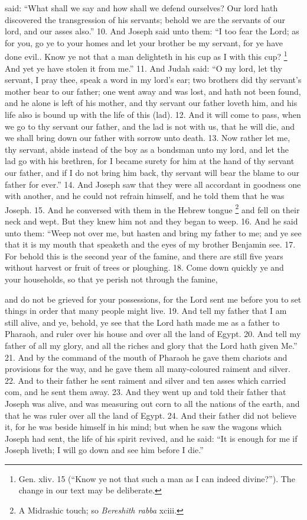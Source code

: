 said: ``What shall we say and how shall we defend ourselves? Our lord hath discovered the transgression of his servants; behold we are the servants of our lord, and our asses also.'' 10. And Joseph said unto them: ``I too fear the Lord; as for you, go ye to your homes and let your brother be my servant, for ye have done evil.. Know ye not that a man delighteth in his cup as I with this cup? \footnote{Gen. xliv. 15 (``Know ye not that such a man as I can indeed divine?''). The change in our text may be deliberate.} And yet ye have stolen it from me.'' 11. And Judah said: ``O my lord, let thy servant, I pray thee, speak a word in my lord's ear; two brothers did thy servant's mother bear to our father; one went away and was lost, and hath not been found, and he alone is left of his mother, and thy servant our father loveth him, and his life also is bound up with the life of this (lad). 12. And it will come to pass, when we go to thy servant our father, and the lad is not with us, that he will die, and we shall bring down our father with sorrow unto death. 13. Now rather let me, thy servant, abide instead of the boy as a bondsman unto my lord, and let the lad go with his brethren, for I became surety for him at the hand of thy servant our father, and if I do not bring him back, thy servant will bear the blame to our father for ever.'' 14. And Joseph saw that they were all accordant in goodness one with another, and he could not refrain himself, and he told them that he was Joseph. 15. And he conversed with them in the Hebrew tongue \footnote{A Midrashic touch; so \emph{Bereshith rabba} xciii.} and fell on their neck and wept. But they knew him not and they began to weep. 16. And he said unto them: ``Weep not over me, but hasten and bring my father to me; and ye see that it is my mouth that speaketh and the eyes of my brother Benjamin see. 17. For behold this is the second year of the famine, and there are still five years without harvest or fruit of trees or ploughing. 18. Come down quickly ye and your households, so that ye perish not through the famine,

and do not be grieved for your possessions, for the Lord sent me before you to set things in order that many people might live. 19. And tell my father that I am still alive, and ye, behold, ye see that the Lord hath made me as a father to Pharaoh, and ruler over his house and over all the land of Egypt. 20. And tell my father of all my glory, and all the riches and glory that the Lord hath given Me.'' 21. And by the command of the mouth of Pharaoh he gave them chariots and provisions for the way, and he gave them all many-coloured raiment and silver. 22. And to their father he sent raiment and silver and ten asses which carried com, and he sent them away. 23. And they went up and told their father that Joseph was alive, and was measuring out corn to all the nations of the earth, and that he was ruler over all the land of Egypt. 24. And their father did not believe it, for he was beside himself in his mind; but when he saw the wagons which Joseph had sent, the life of his spirit revived, and he said: ``It is enough for me if Joseph liveth; I will go down and see him before I die.''

